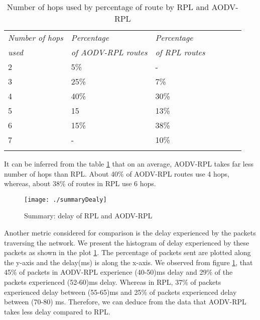\documentclass[conference, letterpaper]{IEEEtran}
\begin{document}
\begin{table}[h!] 
\centering 
\begin{tabular}{lllllll} 
\toprule 
\emph{Number of hops } & \emph{Percentage }  & \emph{ Percentage }\\
\emph{used} & \emph{of AODV-RPL routes} & \emph{of RPL routes}\\
\midrule 2 &  5\% & -\\ 3 & 25\% & 7\% & \\ 4 & 40\% & 30\% & \\ 5 & 15 & 13\%& \\6 & 15\% & 38\% &\\7 &-&10\%\\
\bottomrule \\ 
\end{tabular}
\caption{Number of hops used by percentage of route by RPL and AODV-RPL} \label{tab:hops-usage} 
\end{table}

It can be inferred from the table \ref{tab:hops-usage} that on an average, AODV-RPL 
takes far less number of hops than RPL. About 40\% of AODV-RPL routes use 4 hops,
whereas, about 38\% of routes in RPL use 6 hops.


\begin{figure}[h!] \texttt{[image: ./summaryDealy]}
\caption{Summary: delay of RPL and AODV-RPL} \label{fig:delay} \end{figure}

Another metric considered for comparison is the delay experienced by the
packets traversing the network. We present the histogram of delay experienced
by these packets as shown in the plot \ref{fig:delay}. The percentage of
packets sent are plotted along the y-axis and the delay(ms) is along the
x-axis. We observed from figure \ref{fig:delay}, that 45\% of packets in
AODV-RPL experience (40-50)ms delay and 29\% of the packets experienced
(52-60)ms delay. Whereas in RPL, 37\% of packets experienced delay between
(55-65)ms and 25\% of packets experienced delay between (70-80) ms. Therefore,
we can deduce from the data that AODV-RPL takes less delay compared to RPL. 
\end{document}

